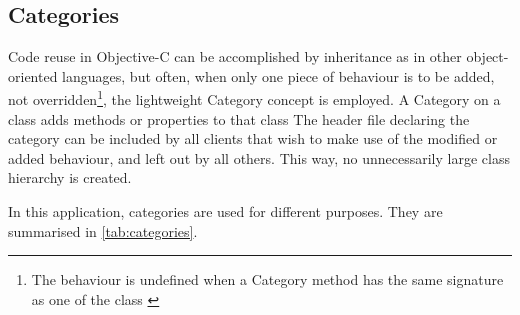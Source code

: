 \subsection{Categories}

Code reuse in Objective-C can be accomplished by inheritance as in other
object-oriented languages, but often, when only one piece of behaviour is to be
added, not overridden\footnote{The behaviour is undefined when a Category method
has the same signature as one of the class \citep{customizing}}, the
lightweight Category concept is employed. A Category on a class adds methods
or properties to that class The header file declaring the category can be
included by all clients that wish to make use of the modified or added
behaviour, and left out by all others. This way, no unnecessarily large class
hierarchy is created.

In this application, categories are used for different purposes. They are
summarised in \autoref{tab:categories}.

